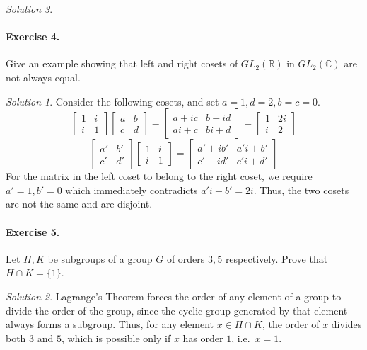 \documentclass[11pt]{report}
\def\C{\mathbb{C}}
\def\R{\mathbb{R}}
\theoremstyle{remark}
\newtheorem*{solution}{Solution}
\begin{document}
\begin{solution}
    \paragraph{Exercise 4.} Give an example showing that left and right cosets of
    $GL_2(\R)$ in $GL_2(\C)$ are not always equal.
    \begin{solution}
        Consider the following cosets, and set $a = 1, d = 2, b = c = 0$. \[
            \begin{bmatrix}
                1 & i \\ i & 1
            \end{bmatrix} \begin{bmatrix}
                a & b \\ c & d
            \end{bmatrix} = \begin{bmatrix}
                a + ic & b + id \\ ai + c & bi + d
            \end{bmatrix} = \begin{bmatrix}
                1 & 2i \\ i & 2
            \end{bmatrix}
        \] \[
            \begin{bmatrix}
                a' & b' \\ c' & d'
            \end{bmatrix} \begin{bmatrix}
                1 & i \\ i & 1
            \end{bmatrix} = \begin{bmatrix}
                a' + ib' & a'i + b' \\ c' + id' & c'i + d'
            \end{bmatrix}
        \] For the matrix in the left coset to belong to the right coset, we require
        $a' = 1, b' = 0$ which immediately contradicts $a'i + b' = 2i$. Thus, the
        two cosets are not the same and are disjoint.
    \end{solution}

    \paragraph{Exercise 5.} Let $H, K$ be subgroups of a group $G$ of orders $3, 5$
    respectively. Prove that $H \cap K = \{1\}$.
    \begin{solution}
        Lagrange's Theorem forces the order of any element of a group to divide the
        order of the group, since the cyclic group generated by that element always
        forms a subgroup. Thus, for any element $x \in H \cap K$, the order of $x$
        divides both $3$ and $5$, which is possible only if $x$ has order $1$, i.e.\
        $x = 1$.
    \end{solution}
    

\end{solution}
\end{document}
